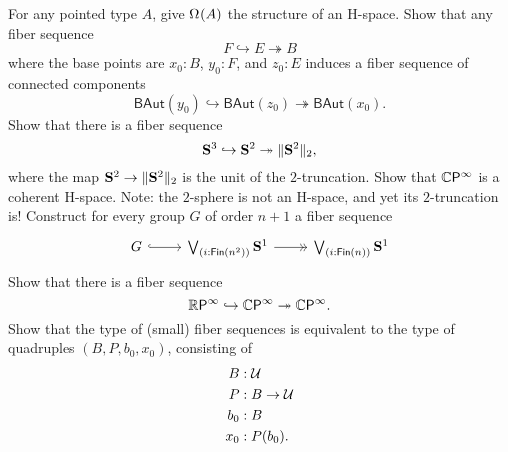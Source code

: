 \begin{exercises}
  \exercise For any pointed type $A$, give $\Omega^{}(A)$ the structure of an H-space.
  \exercise Show that any fiber sequence
\begin{equation*}
  F \hookrightarrow E \twoheadrightarrow B
\end{equation*}
where the base points are $x_0:B$, $y_0:F$, and $z_0:E$ induces a fiber sequence of connected components
\begin{equation*}
  \mathsf{BAut}(y_0) \hookrightarrow \mathsf{BAut}(z_0) \twoheadrightarrow \mathsf{BAut}(x_0).
\end{equation*}
  \exercise Show that there is a fiber sequence
\begin{equation*}
  \mathbf{S}^{3}\hookrightarrow\mathbf{S}^{2}\twoheadrightarrow\Vert \mathbf{S}^{2}\Vert_{2},
\end{equation*}
where the map $\mathbf{S}^{2}\to\Vert \mathbf{S}^{2}\Vert_{2}$ is the unit of the $2$-truncation.
  \exercise Show that $\mathbb{C}\mathsf{P}^{\infty}$ is a coherent H-space. Note: the $2$-sphere is not an H-space, and yet its $2$-truncation is!
  \exercise Construct for every group $G$ of order $n+1$ a fiber sequence
  \begin{equation*}
    \begin{tikzcd}
      G \arrow[r,hook] & \bigvee_{(i:\Fin(n^2))}\sphere{1}\arrow[r,->>] & \bigvee_{(i:\Fin(n))}\sphere{1}
    \end{tikzcd}
  \end{equation*}
  \exercise Show that there is a fiber sequence
\begin{equation*}
  \mathbb{R}\mathsf{P}^{\infty}\hookrightarrow\mathbb{C}\mathsf{P}^{\infty}\twoheadrightarrow\mathbb{C}\mathsf{P}^{\infty}.
\end{equation*}
\exercise Show that the type of (small) fiber sequences is equivalent to the type of quadruples $(B,P,b_0,x_0)$, consisting of
\begin{align*}
B & : \mathcal{U} \\
P & : B \to \mathcal{U} \\
b_0 & : B \\
x_0 & : P(b_0).
\end{align*}
\end{exercises}
